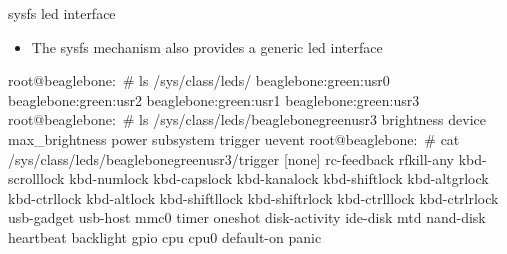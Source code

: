 \begin{frame}
   {sysfs led interface}
   \begin{itemize}
      \item The sysfs mechanism also provides a generic led interface
   \end{itemize}
   \begin{raw}
root@beaglebone:~# ls /sys/class/leds/
beaglebone:green:usr0  beaglebone:green:usr2
beaglebone:green:usr1  beaglebone:green:usr3
root@beaglebone:~# ls /sys/class/leds/beaglebone\:green\:usr3
brightness  device  max_brightness  power  subsystem  trigger  uevent
root@beaglebone:~# cat /sys/class/leds/beaglebone\:green\:usr3/trigger 
[none] rc-feedback rfkill-any kbd-scrolllock kbd-numlock kbd-capslock
kbd-kanalock kbd-shiftlock kbd-altgrlock kbd-ctrllock kbd-altlock
kbd-shiftllock kbd-shiftrlock kbd-ctrlllock kbd-ctrlrlock usb-gadget
usb-host mmc0 timer oneshot disk-activity ide-disk mtd nand-disk
heartbeat backlight gpio cpu cpu0 default-on panic 
   \end{raw}
\end{frame}

\cprotect\note{

}


